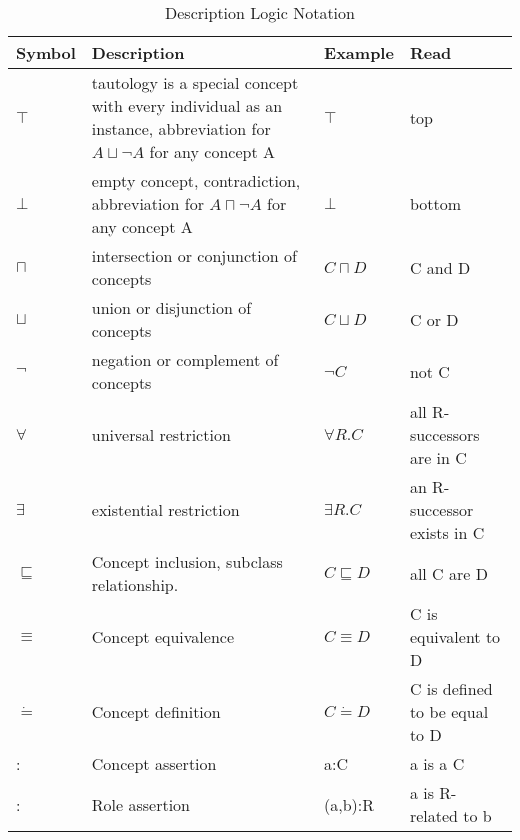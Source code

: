 \begin{longtable}[h]{ p{10mm} p{60mm} p{15mm} p{45mm}}
\caption{Description Logic Notation}
\label{table:DL_notation}\\
\hline
\hline
Symbol & Description & Example & Read\\
\hline
$\top$ & tautology is a special concept with every individual as an instance, abbreviation for $A \sqcup \neg A$ for any concept A & $\top$ & top\\
\hline
$\bot$ & empty concept, contradiction, abbreviation for $A \sqcap \neg A$ for any concept A & $\bot$ & bottom\\
\hline
$\sqcap$ & intersection or conjunction of concepts & $ C \sqcap D $ & C and D\\
\hline
$\sqcup$ & union or disjunction of concepts	& $ C \sqcup D $ & C or D\\
\hline
$\neg$ & negation or complement of concepts	& $\neg C$ & not C\\
\hline
$\forall$ & universal restriction & $\forall R.C$ & all R-successors are in C\\
\hline
$\exists$ & existential restriction	& $\exists R.C$ & an R-successor exists in C\\
\hline
$\sqsubseteq$ & Concept inclusion, subclass relationship. & $ C \sqsubseteq D $ & all C are D\\
\hline
$ \equiv $ & Concept equivalence & $ C \equiv D $ &	C is equivalent to D\\
\hline
$\dot{=}$ & Concept definition & $ C \dot{=} D $ & C is defined to be equal to D\\
\hline
: &	Concept assertion & a:C & a is a C\\
\hline
: &	Role assertion & (a,b):R & a is R-related to b\\
\hline
\hline
\end{longtable}

